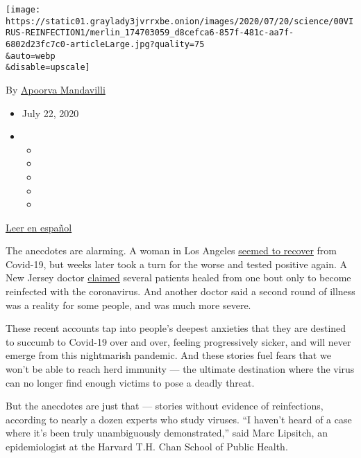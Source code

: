 \texttt{[image: https://static01.graylady3jvrrxbe.onion/images/2020/07/20/science/00VIRUS-REINFECTION1/merlin\_174703059\_d8cefca6-857f-481c-aa7f-6802d23fc7c0-articleLarge.jpg?quality=75\\\&auto=webp\\\&disable=upscale]}

By
\href{https://www.nytimes3xbfgragh.onion/by/apoorva-mandavilli}{Apoorva
Mandavilli}

\begin{itemize}
\item
  July 22, 2020
\item
  \begin{itemize}
  \item
  \item
  \item
  \item
  \item
  \end{itemize}
\end{itemize}

\href{https://www.nytimes3xbfgragh.onion/es/2020/07/24/espanol/ciencia-y-tecnologia/reinfeccion-coronavirus.html}{Leer
en español}

The anecdotes are alarming. A woman in Los Angeles
\href{https://www.foxla.com/news/southern-california-woman-tests-positive-for-covid-19-for-second-time-after-initial-recovery}{seemed
to recover} from Covid-19, but weeks later took a turn for the worse and
tested positive again. A New Jersey doctor
\href{https://dailyvoice.com/new-jersey/monmouth/news/central-jersey-doctor-reports-patients-reinfected-with-coronavirus/790555/}{claimed}
several patients healed from one bout only to become reinfected with the
coronavirus. And another doctor said a second round of illness was a
reality for some people, and was much more severe.

These recent accounts tap into people's deepest anxieties that they are
destined to succumb to Covid-19 over and over, feeling progressively
sicker, and will never emerge from this nightmarish pandemic. And these
stories fuel fears that we won't be able to reach herd immunity --- the
ultimate destination where the virus can no longer find enough victims
to pose a deadly threat.

But the anecdotes are just that --- stories without evidence of
reinfections, according to nearly a dozen experts who study viruses. ``I
haven't heard of a case where it's been truly unambiguously
demonstrated,'' said Marc Lipsitch, an epidemiologist at the Harvard
T.H. Chan School of Public Health.

